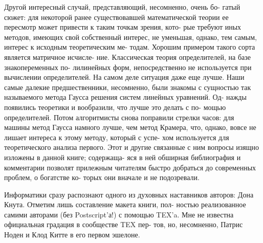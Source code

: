 {{  Другой интересный случай, представляющий, несомненно, очень бо-\linebreak
гатый сюжет: для некоторой ранее существовавшей математической\linebreak
теории ее пересмотр может привести к таким точкам зрения, кото-\linebreak
рые требуют иных методов, имеющих свой собственный интерес, не\linebreak
уменьшая, однако, тем самым, интерес к исходным теоретическим ме-\linebreak
тодам. Хорошим примером такого сорта является матричное исчисле-\linebreak
ние. Классическая теория определителей, на базе знакопеременных по-\linebreak
лилинейных форм, непосредственно не используется при вычислении\linebreak
определителей. На самом деле ситуация даже еще лучше. Наши самые\linebreak
далекие предшественники, несомненно, были знакомы с сущностью так\linebreak
называемого метода Гаусса решения систем линейных уравнений. Од-\linebreak
нажды появились теоретики и вообразили, что лучше это делать с по-\linebreak
мощью определителей. Потом алгоритмисты снова поправили стрелки\linebreak
часов: для машины метод Гаусса намного лучше, чем метод Крамера,\linebreak
что, однако, вовсе не лишает интереса к этому методу, который с успе-\linebreak
хом используется для теоретического анализа первого. Этот и другие\linebreak
связанные с ним вопросы изящно изложены в данной книге; содержаща-\linebreak
яся в ней обширная библиография и комментарии позволят прилежным\linebreak
читателям быстро добраться до современных проблем, о богатстве ко-\linebreak
торых они вначале и не подозревали.

   Информатики сразу распознают одного из духовных наставников\linebreak
авторов: Дона Кнута. Отметим лишь составление макета книги, пол-\linebreak
ностью реализованное самими авторами (без Postscript’а!) с помощью\linebreak
TEX'a. Мне не известна официальная градация в сообществе TEX пер-\linebreak
тов, но, несомненно, Патрис Ноден и Клод Китте в его первом эшелоне.\linebreak

}}
